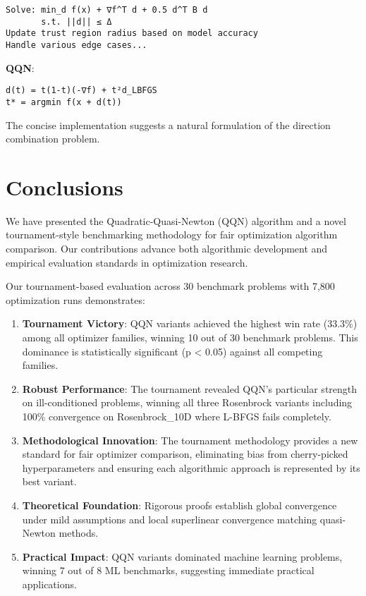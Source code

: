 \begin{verbatim}
Solve: min_d f(x) + ∇f^T d + 0.5 d^T B d
       s.t. ||d|| ≤ Δ
Update trust region radius based on model accuracy
Handle various edge cases...
\end{verbatim}

\textbf{QQN}:

\begin{verbatim}
d(t) = t(1-t)(-∇f) + t²d_LBFGS
t* = argmin f(x + d(t))
\end{verbatim}

The concise implementation suggests a natural formulation of the direction combination problem.

\hypertarget{conclusions}{%
\section{Conclusions}\label{conclusions}}

We have presented the Quadratic-Quasi-Newton (QQN) algorithm and a novel tournament-style benchmarking methodology for fair optimization algorithm comparison. Our contributions advance both algorithmic development and empirical evaluation standards in optimization research.

Our tournament-based evaluation across 30 benchmark problems with 7,800 optimization runs demonstrates:

\begin{enumerate}
\def\labelenumi{\arabic{enumi}.}
\item
  \textbf{Tournament Victory}: QQN variants achieved the highest win rate (33.3\%) among all optimizer families, winning 10 out of 30 benchmark problems. This dominance is statistically significant (p \textless{} 0.05) against all competing families.
\item
  \textbf{Robust Performance}: The tournament revealed QQN's particular strength on ill-conditioned problems, winning all three Rosenbrock variants including 100\% convergence on Rosenbrock\_10D where L-BFGS fails completely.
\item
  \textbf{Methodological Innovation}: The tournament methodology provides a new standard for fair optimizer comparison, eliminating bias from cherry-picked hyperparameters and ensuring each algorithmic approach is represented by its best variant.
\item
  \textbf{Theoretical Foundation}: Rigorous proofs establish global convergence under mild assumptions and local superlinear convergence matching quasi-Newton methods.
\item
  \textbf{Practical Impact}: QQN variants dominated machine learning problems, winning 7 out of 8 ML benchmarks, suggesting immediate practical applications.
\end{enumerate}


